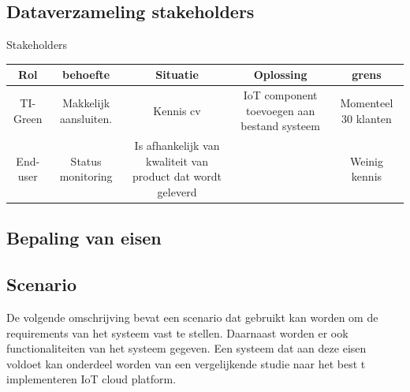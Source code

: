 \subsection{Dataverzameling stakeholders}

\begin{frame}{Stakeholders}
	\begin{table}[htbp]
		\centering
		\begin{tabular}{|c|c|c|c|c|}\hline
			Rol&behoefte&Situatie&Oplossing&grens\\\hline
			
			
			TI-Green&\multicolumn{1}{m{2cm}|}{Makkelijk aansluiten.   }&\multicolumn{1}{m{4cm}|}{ Kennis cv}&
			\multicolumn{1}{m{3cm}|}{	IoT component toevoegen aan bestand systeem
			}&\multicolumn{1}{m{3cm}|}{ Momenteel 30 klanten}\\\hline
			
			
			End-user &\multicolumn{1}{m{2cm}|}{Status monitoring }&\multicolumn{1}{m{4cm}|}{Is afhankelijk van kwaliteit van product dat wordt geleverd }&
			\multicolumn{1}{m{4cm}|}{ }&\multicolumn{1}{m{3cm}|}{Weinig kennis }\\\hline
			
			
			
			
			
			
		\end{tabular}
	\end{table}
	
\end{frame}
\subsection{Bepaling van eisen}

\subsection{Scenario}
De volgende omschrijving bevat een scenario dat gebruikt kan worden om de requirements van het systeem vast te stellen. Daarnaast worden er ook functionaliteiten van het systeem gegeven. Een systeem dat aan deze eisen voldoet kan onderdeel worden van een vergelijkende studie naar het best t implementeren IoT cloud platform.

